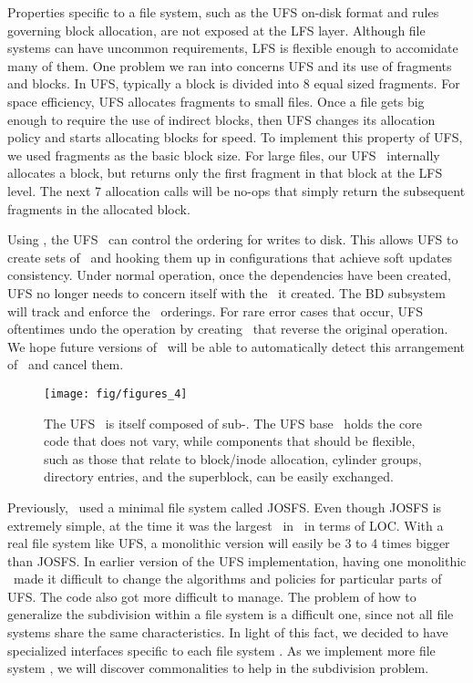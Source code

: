 Properties specific to a file system, such as the UFS on-disk format and rules
governing block allocation, are not exposed at the LFS layer. Although file
systems can have uncommon requirements, LFS is flexible enough to accomidate
many of them. One problem we ran into concerns UFS and its use of fragments
and blocks. In UFS, typically a block is divided into 8 equal sized fragments.
For space efficiency, UFS allocates fragments to small files. Once a file gets
big enough to require the use of indirect blocks, then UFS changes its
allocation policy and starts allocating blocks for speed. To implement this
property of UFS, we used fragments as the basic block size. For large files,
our UFS \module\ internally allocates a block, but returns only the first
fragment in that block at the LFS level. The next 7 allocation calls will be
no-ops that simply return the subsequent fragments in the allocated block.

Using \chdescs, the UFS \module\ can control the ordering for writes to disk.
This allows UFS to create sets of \chdescs\ and hooking them up in
configurations that achieve soft updates consistency. Under normal operation,
once the dependencies have been created, UFS no longer needs to concern itself
with the \chdescs\ it created. The BD subsystem will track and enforce the
\chdesc\ orderings. For rare error cases that occur, UFS oftentimes
undo the operation by creating \chdescs\ that reverse the original operation.
We hope future versions of \Kudos\ will be able to automatically detect this
arrangement of \chdescs\ and cancel them.

\begin{figure}[tb]
  \centering
  \texttt{[image: fig/figures\_4]}
  \caption{\label{fig:ufsmodules} The UFS \module\ is itself composed of
  sub-\modules. The UFS base \module\ holds the core code that does not
  vary, while components that should be flexible, such as those that relate
  to block/inode allocation, cylinder groups, directory entries, and the
  superblock, can be easily exchanged.}
\end{figure}

Previously, \Kudos\ used a minimal file system called JOSFS. Even though JOSFS
is extremely simple, at the time it was the largest \module\ in \Kudos\ in
terms of LOC. With a real file system like UFS, a monolithic version will
easily be 3 to 4 times bigger than JOSFS. In earlier version of the \Kudos UFS
implementation, having one monolithic \module\ made it difficult to change the
algorithms and policies for particular parts of UFS. The code also got more
difficult to manage. The problem of how to generalize the subdivision within
a file system is a difficult one, since not all file systems share the same
characteristics. In light of this fact, we decided to have specialized
interfaces specific to each file system \module. As we implement more file
system \modules, we will discover commonalities to help in the subdivision
problem.

